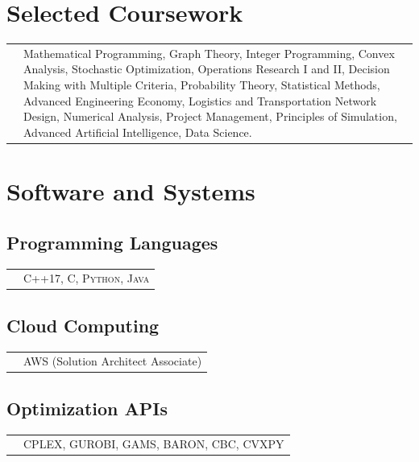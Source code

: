 \documentclass[10PT,letter]{article}
\newcommand{\subsectionstyle}[1]{\normalfont\selectfont\textcolor{titlecol}{\sffamily #1}}
\newcommand{\numbox}[1]{} %
\begin{document}
    \section*{\numbox{7}\bfseries\textcolor{titlecol}{\sffamily Selected Coursework}}
			\begin{tabular}{p{0.1in}p{6.55in}}
				
				\textsc{} & 
									Mathematical Programming,   Graph Theory,  Integer Programming, Convex Analysis,  Stochastic Optimization, Operations Research I and II, Decision Making with Multiple Criteria, Probability Theory, Statistical Methods,  Advanced Engineering Economy,  Logistics and Transportation Network Design, Numerical Analysis, Project Management, Principles of Simulation, Advanced Artificial Intelligence, Data Science.\\[1mm]

			\end{tabular}




\section*{\numbox{9}\bfseries\textcolor{titlecol}{\sffamily Software and Systems}}
        	\subsection*{\subsectionstyle{Programming Languages}}
		            \begin{tabular}{p{0.2in}p{5.55in}}
		                & \textsc{C++17, C, Python, Java}
		            \end{tabular}
        
        \subsection*{\subsectionstyle{Cloud Computing}}
		        \begin{tabular}{p{.2in}p{5.55in}}
		        	 & \textsc{AWS} (Solution Architect Associate)
		        \end{tabular}
    
   	  	\subsection*{\subsectionstyle{Optimization  APIs}}
			    \begin{tabular}{p{.2in}p{5.55in}}
			     	& 	\textsc{CPLEX, GUROBI, GAMS, BARON, CBC, CVXPY}
			    \end{tabular}
\end{document}
